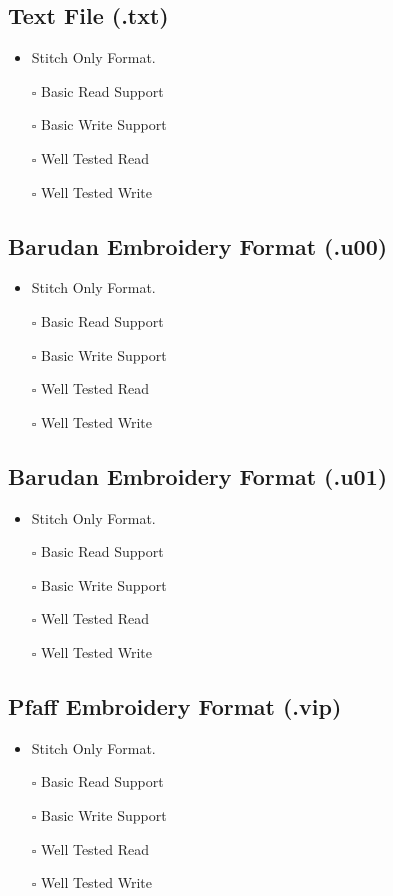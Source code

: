 \documentclass[onesize, a4paper]{refart}
\providecommand{\tightlist}{\setlength{\itemsep}{0pt}\setlength{\parskip}{0pt}}
\begin{document}
\subsection{Text File (.txt)}

\begin{itemize}
\tightlist
\item Stitch Only Format.
\item[$\square$] Basic Read Support
\item[$\square$] Basic Write Support
\item[$\square$] Well Tested Read
\item[$\square$] Well Tested Write
\end{itemize}

\subsection{Barudan Embroidery Format (.u00)}

\begin{itemize}
\tightlist
\item Stitch Only Format.
\item[$\square$] Basic Read Support
\item[$\square$] Basic Write Support
\item[$\square$] Well Tested Read
\item[$\square$] Well Tested Write
\end{itemize}

\subsection{Barudan Embroidery Format (.u01)}

\begin{itemize}
\tightlist
\item Stitch Only Format.
\item[$\square$] Basic Read Support
\item[$\square$] Basic Write Support
\item[$\square$] Well Tested Read
\item[$\square$] Well Tested Write
\end{itemize}

\subsection{Pfaff Embroidery Format (.vip)}

\begin{itemize}
\tightlist
\item Stitch Only Format.
\item[$\square$] Basic Read Support
\item[$\square$] Basic Write Support
\item[$\square$] Well Tested Read
\item[$\square$] Well Tested Write
\end{itemize}
\end{document}
